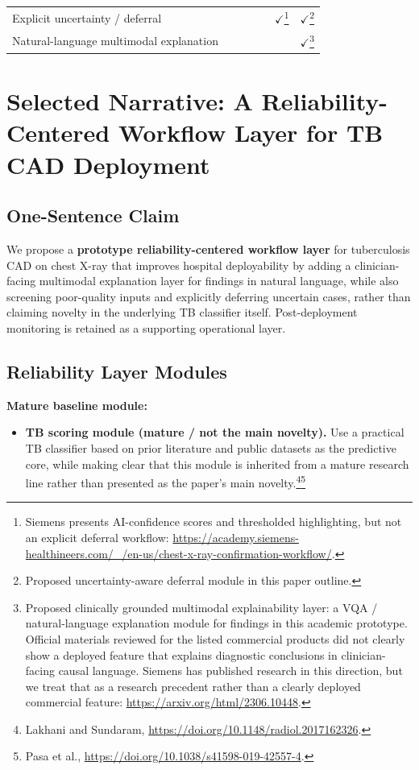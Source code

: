 \documentclass[11pt]{article}
\begin{document}
{\begin{longtable}{p{} p{} p{} p{} p{} p{} p{}}
Explicit uncertainty / deferral &  &  &  &  & $\checkmark$\footnote{Siemens presents AI-confidence scores and thresholded highlighting, but not an explicit deferral workflow: \url{https://academy.siemens-healthineers.com/_/en-us/chest-x-ray-confirmation-workflow/}.} & $\checkmark$\footnote{Proposed uncertainty-aware deferral module in this paper outline.} \\

Natural-language multimodal explanation &  &  &  &  &  & $\checkmark$\footnote{Proposed clinically grounded multimodal explainability layer: a VQA / natural-language explanation module for findings in this academic prototype. Official materials reviewed for the listed commercial products did not clearly show a deployed feature that explains diagnostic conclusions in clinician-facing causal language. Siemens has published research in this direction, but we treat that as a research precedent rather than a clearly deployed commercial feature: \url{https://arxiv.org/html/2306.10448}.} \\
\bottomrule
\end{longtable}
}

\section{Selected Narrative: A Reliability-Centered Workflow Layer for TB CAD Deployment}

\subsection{One-Sentence Claim}

We propose a \textbf{prototype reliability-centered workflow layer} for tuberculosis CAD on chest X-ray that improves hospital deployability by adding a clinician-facing multimodal explanation layer for findings in natural language, while also screening poor-quality inputs and explicitly deferring uncertain cases, rather than claiming novelty in the underlying TB classifier itself. Post-deployment monitoring is retained as a supporting operational layer.

\subsection{Reliability Layer Modules}

\textbf{Mature baseline module:}
\begin{itemize}[leftmargin=1.5em]
    \item \textbf{TB scoring module (mature / not the main novelty).} Use a practical TB classifier based on prior literature and public datasets as the predictive core, while making clear that this module is inherited from a mature research line rather than presented as the paper's main novelty.\footnote{Lakhani and Sundaram, \url{https://doi.org/10.1148/radiol.2017162326}.}\footnote{Pasa et al., \url{https://doi.org/10.1038/s41598-019-42557-4}.}
\end{itemize}
\end{document}
